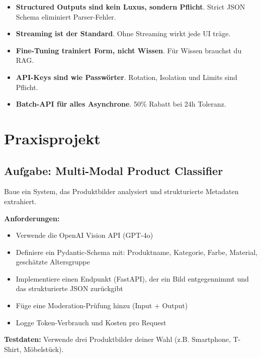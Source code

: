 \par\mbox{}\par
\begin{merkeEnv}
\begin{itemize}
    \item \textbf{Structured Outputs sind kein Luxus, sondern Pflicht}. Strict JSON Schema eliminiert Parser-Fehler.
    \item \textbf{Streaming ist der Standard}. Ohne Streaming wirkt jede UI träge.
    \item \textbf{Fine-Tuning trainiert Form, nicht Wissen}. Für Wissen brauchst du RAG.
    \item \textbf{API-Keys sind wie Passwörter}. Rotation, Isolation und Limits sind Pflicht.
    \item \textbf{Batch-API für alles Asynchrone}. 50\% Rabatt bei 24h Toleranz.
\end{itemize}
\end{merkeEnv}

\section{Praxisprojekt}

\subsection{Aufgabe: Multi-Modal Product Classifier}

Baue ein System, das Produktbilder analysiert und strukturierte Metadaten extrahiert.

\textbf{Anforderungen:}
\begin{itemize}[leftmargin=*]
    \item Verwende die OpenAI Vision API (GPT-4o)
    \item Definiere ein Pydantic-Schema mit: Produktname, Kategorie, Farbe, Material, geschätzte Altersgruppe
    \item Implementiere einen Endpunkt (FastAPI), der ein Bild entgegennimmt und das strukturierte JSON zurückgibt
    \item Füge eine Moderation-Prüfung hinzu (Input + Output)
    \item Logge Token-Verbrauch und Kosten pro Request
\end{itemize}

\textbf{Testdaten:} Verwende drei Produktbilder deiner Wahl (z.B. Smartphone, T-Shirt, Möbelstück).

